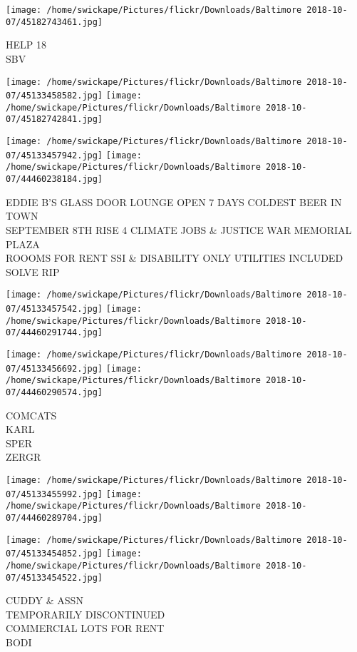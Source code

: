 \documentclass[10pt,letterpaper]{article}
\begin{document}
\vspace{0.25in}
\texttt{[image: /home/swickape/Pictures/flickr/Downloads/Baltimore 2018-10-07/45182743461.jpg]}

HELP 18\\
SBV
\pagebreak

\texttt{[image: /home/swickape/Pictures/flickr/Downloads/Baltimore 2018-10-07/45133458582.jpg]}
\texttt{[image: /home/swickape/Pictures/flickr/Downloads/Baltimore 2018-10-07/45182742841.jpg]}

\texttt{[image: /home/swickape/Pictures/flickr/Downloads/Baltimore 2018-10-07/45133457942.jpg]}
\texttt{[image: /home/swickape/Pictures/flickr/Downloads/Baltimore 2018-10-07/44460238184.jpg]}

EDDIE B'S GLASS DOOR LOUNGE OPEN 7 DAYS COLDEST BEER IN TOWN\\
SEPTEMBER 8TH RISE 4 CLIMATE JOBS \& JUSTICE WAR MEMORIAL PLAZA\\
ROOOMS FOR RENT SSI \& DISABILITY ONLY UTILITIES INCLUDED\\
SOLVE RIP
\pagebreak

\texttt{[image: /home/swickape/Pictures/flickr/Downloads/Baltimore 2018-10-07/45133457542.jpg]}
\texttt{[image: /home/swickape/Pictures/flickr/Downloads/Baltimore 2018-10-07/44460291744.jpg]}

\texttt{[image: /home/swickape/Pictures/flickr/Downloads/Baltimore 2018-10-07/45133456692.jpg]}
\texttt{[image: /home/swickape/Pictures/flickr/Downloads/Baltimore 2018-10-07/44460290574.jpg]}

COMCATS\\
KARL\\
SPER\\
ZERGR
\pagebreak

\texttt{[image: /home/swickape/Pictures/flickr/Downloads/Baltimore 2018-10-07/45133455992.jpg]}
\texttt{[image: /home/swickape/Pictures/flickr/Downloads/Baltimore 2018-10-07/44460289704.jpg]}

\texttt{[image: /home/swickape/Pictures/flickr/Downloads/Baltimore 2018-10-07/45133454852.jpg]}
\texttt{[image: /home/swickape/Pictures/flickr/Downloads/Baltimore 2018-10-07/45133454522.jpg]}

CUDDY \& ASSN\\
TEMPORARILY DISCONTINUED\\
COMMERCIAL LOTS FOR RENT\\
BODI
\pagebreak
\end{document}
